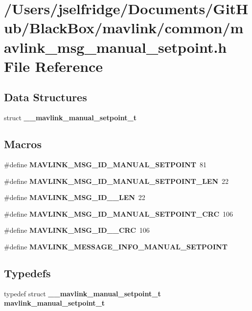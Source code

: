 \section{/\+Users/jselfridge/\+Documents/\+Git\+Hub/\+Black\+Box/mavlink/common/mavlink\+\_\+msg\+\_\+manual\+\_\+setpoint.h File Reference}
\label{mavlink__msg__manual__setpoint_8h}
\subsection*{Data Structures}
\begin{DoxyCompactItemize}
\item 
struct \textbf{ \+\_\+\+\_\+mavlink\+\_\+manual\+\_\+setpoint\+\_\+t}
\end{DoxyCompactItemize}
\subsection*{Macros}
\begin{DoxyCompactItemize}
\item 
\#define \textbf{ M\+A\+V\+L\+I\+N\+K\+\_\+\+M\+S\+G\+\_\+\+I\+D\+\_\+\+M\+A\+N\+U\+A\+L\+\_\+\+S\+E\+T\+P\+O\+I\+NT}~81
\item 
\#define \textbf{ M\+A\+V\+L\+I\+N\+K\+\_\+\+M\+S\+G\+\_\+\+I\+D\+\_\+\+M\+A\+N\+U\+A\+L\+\_\+\+S\+E\+T\+P\+O\+I\+N\+T\+\_\+\+L\+EN}~22
\item 
\#define \textbf{ M\+A\+V\+L\+I\+N\+K\+\_\+\+M\+S\+G\+\_\+\+I\+D\+\_\+\_\+\+L\+EN}~22
\item 
\#define \textbf{ M\+A\+V\+L\+I\+N\+K\+\_\+\+M\+S\+G\+\_\+\+I\+D\+\_\+\+M\+A\+N\+U\+A\+L\+\_\+\+S\+E\+T\+P\+O\+I\+N\+T\+\_\+\+C\+RC}~106
\item 
\#define \textbf{ M\+A\+V\+L\+I\+N\+K\+\_\+\+M\+S\+G\+\_\+\+I\+D\+\_\+\_\+\+C\+RC}~106
\item 
\#define \textbf{ M\+A\+V\+L\+I\+N\+K\+\_\+\+M\+E\+S\+S\+A\+G\+E\+\_\+\+I\+N\+F\+O\+\_\+\+M\+A\+N\+U\+A\+L\+\_\+\+S\+E\+T\+P\+O\+I\+NT}
\end{DoxyCompactItemize}
\subsection*{Typedefs}
\begin{DoxyCompactItemize}
\item 
typedef struct \textbf{ \+\_\+\+\_\+mavlink\+\_\+manual\+\_\+setpoint\+\_\+t} \textbf{ mavlink\+\_\+manual\+\_\+setpoint\+\_\+t}
\end{DoxyCompactItemize}


